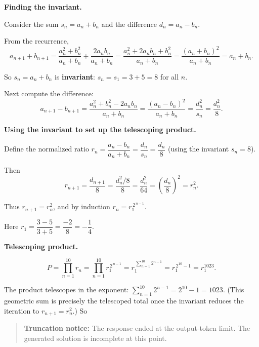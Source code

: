 \documentclass[
  11pt,
  letterpaper,
]{article}
\begin{document}
\textbf{Finding the invariant.}

Consider the sum \(s_n = a_n + b_n\) and the difference
\(d_n = a_n - b_n\).

From the recurrence,
\[a_{n+1} + b_{n+1} = \frac{a_n^2 + b_n^2}{a_n+b_n} + \frac{2a_nb_n}{a_n+b_n} = \frac{a_n^2 + 2a_nb_n + b_n^2}{a_n+b_n} = \frac{(a_n+b_n)^2}{a_n+b_n} = a_n + b_n.\]

So \(s_n = a_n + b_n\) is \textbf{invariant}: \(s_n = s_1 = 3 + 5 = 8\)
for all \(n\).

Next compute the difference:
\[a_{n+1} - b_{n+1} = \frac{a_n^2 + b_n^2 - 2a_nb_n}{a_n+b_n} = \frac{(a_n - b_n)^2}{a_n + b_n} = \frac{d_n^2}{s_n} = \frac{d_n^2}{8}.\]

\textbf{Using the invariant to set up the telescoping product.}

Define the normalized ratio
\(r_n = \dfrac{a_n - b_n}{a_n + b_n} = \dfrac{d_n}{s_n} = \dfrac{d_n}{8}\)
(using the invariant \(s_n = 8\)).

Then
\[r_{n+1} = \frac{d_{n+1}}{8} = \frac{d_n^2/8}{8} = \frac{d_n^2}{64} = \left(\frac{d_n}{8}\right)^2 = r_n^2.\]

Thus \(r_{n+1} = r_n^2\), and by induction \(r_n = r_1^{\,2^{\,n-1}}\).

Here \(r_1 = \dfrac{3-5}{3+5} = \dfrac{-2}{8} = -\dfrac14\).

\textbf{Telescoping product.}

\[P = \prod_{n=1}^{10} r_n = \prod_{n=1}^{10} r_1^{\,2^{\,n-1}} = r_1^{\,\sum_{n=1}^{10} 2^{n-1}} = r_1^{\,2^{10}-1} = r_1^{1023}.\]

The product telescopes in the exponent:
\(\sum_{n=1}^{10} 2^{n-1} = 2^{10} - 1 = 1023\). (This geometric sum is
precisely the telescoped total once the invariant reduces the iteration
to \(r_{n+1}=r_n^2\).) So

\begin{quote}
\textbf{Truncation notice:} The response ended at the output-token
limit. The generated solution is incomplete at this point.
\end{quote}

\clearpage
\end{document}

